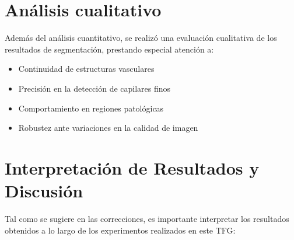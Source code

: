 \documentclass[11pt,a4paper]{report} %
\begin{document}
\section{Análisis cualitativo}
Además del análisis cuantitativo, se realizó una evaluación cualitativa de los resultados de segmentación, prestando especial atención a:
\begin{itemize}
  \item Continuidad de estructuras vasculares
  \item Precisión en la detección de capilares finos
  \item Comportamiento en regiones patológicas
  \item Robustez ante variaciones en la calidad de imagen
\end{itemize}

\section{Interpretación de Resultados y Discusión}
Tal como se sugiere en las correcciones, es importante interpretar los resultados obtenidos a lo largo de los experimentos realizados en este TFG:
\end{document}
